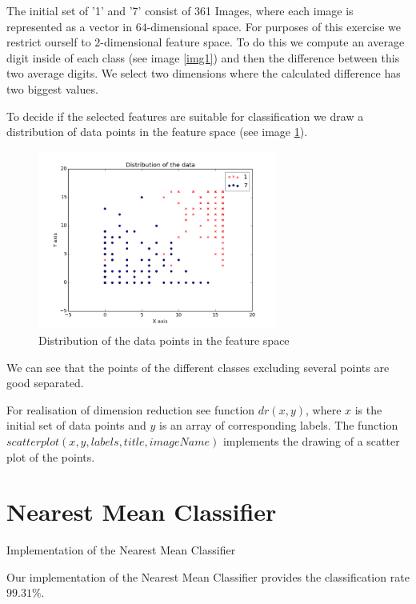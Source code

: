 \documentclass{article}
\begin{document}
The initial set of '1' and '7' consist of 361 Images, where each image is represented as a vector in $64$-dimensional space. For purposes of this exercise we restrict ourself to $2$-dimensional feature space. To do this we compute an average digit inside of each class (see image \ref{img1}) and then the difference between this two average digits. We select two dimensions where the calculated difference has two biggest values.

To decide if the selected features are suitable for classification we draw a distribution of data points in the feature space (see image \ref{img2}).

\begin{figure}[ht]
	\centering
  	\includegraphics[width=0.7\textwidth]{../dataDistribution.png}
	\caption{Distribution of the data points in the feature space}
	\label{img2}
\end{figure}

We can see that the points of the different classes excluding several points are good separated.

For realisation of dimension reduction see function $dr(x,y)$, where $x$ is the initial set of data points and $y$ is an array of corresponding labels. The function $scatterplot(x,y,labels, title, imageName)$ implements the drawing of a scatter plot of the points.

\FloatBarrier

\section{Nearest Mean Classifier}

Implementation of the Nearest Mean Classifier



Our implementation of the Nearest Mean Classifier provides the classification rate $99.31\%$. 
\end{document}
